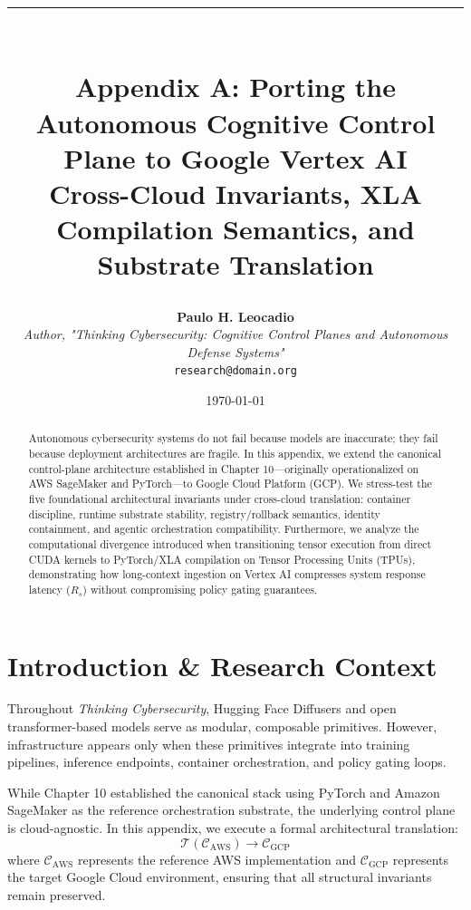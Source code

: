 \documentclass[10pt,a4paper]{article}
\title{
  \vspace{-1.5cm}
  {\color{googleblue}\rule{\textwidth}{2pt}}\\[0.4cm]
  \Large\bfseries Appendix A: Porting the Autonomous Cognitive Control Plane to Google Vertex AI\\
  \large Cross-Cloud Invariants, XLA Compilation Semantics, and Substrate Translation
  \vspace{0.2cm}
}
\author{
  \textbf{Paulo H. Leocadio}\\
  \small\textit{Author, "Thinking Cybersecurity: Cognitive Control Planes and Autonomous Defense Systems"}\\
  \small\texttt{research@domain.org}
}
\date{\small\today}
\begin{document}
\maketitle

\begin{abstract}
\noindent
Autonomous cybersecurity systems do not fail because models are inaccurate; they fail because deployment architectures are fragile. In this appendix, we extend the canonical control-plane architecture established in Chapter 10---originally operationalized on AWS SageMaker and PyTorch---to Google Cloud Platform (GCP). We stress-test the five foundational architectural invariants under cross-cloud translation: container discipline, runtime substrate stability, registry/rollback semantics, identity containment, and agentic orchestration compatibility. Furthermore, we analyze the computational divergence introduced when transitioning tensor execution from direct CUDA kernels to PyTorch/XLA compilation on Tensor Processing Units (TPUs), demonstrating how long-context ingestion on Vertex AI compresses system response latency ($R_s$) without compromising policy gating guarantees.
\end{abstract}

\vspace{0.3cm}

\section{Introduction \& Research Context}
Throughout \textit{Thinking Cybersecurity}, Hugging Face Diffusers and open transformer-based models serve as modular, composable primitives. However, infrastructure appears only when these primitives integrate into training pipelines, inference endpoints, container orchestration, and policy gating loops.

While Chapter 10 established the canonical stack using PyTorch and Amazon SageMaker as the reference orchestration substrate, the underlying control plane is cloud-agnostic. In this appendix, we execute a formal architectural translation:
\begin{equation}
  \mathcal{T}(\mathcal{C}_{\text{AWS}}) \rightarrow \mathcal{C}_{\text{GCP}}
\end{equation}
where $\mathcal{C}_{\text{AWS}}$ represents the reference AWS implementation and $\mathcal{C}_{\text{GCP}}$ represents the target Google Cloud environment, ensuring that all structural invariants remain preserved.
\end{document}
